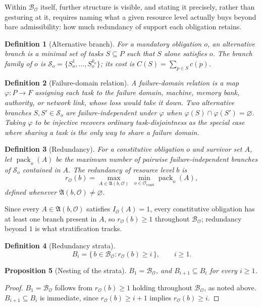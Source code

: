 \documentclass[11pt]{report}
\newtheorem{definition}{Definition}[chapter]
\newtheorem{proposition}[definition]{Proposition}
\begin{document}
Within $\mathcal B_{\mathcal O}$ itself, further structure is visible, and stating it precisely, rather than gesturing at it, requires naming what a given resource level actually buys beyond bare admissibility: how much redundancy of support each obligation retains.

\begin{definition}[Alternative branch]
For a mandatory obligation $o$, an alternative branch is a minimal set of tasks $S \subseteq P$ such that $S$ alone satisfies $o$. The branch family of $o$ is $\mathcal S_o = \{S_o^1, \ldots, S_o^{k_o}\}$; its cost is $C(S) = \sum_{p \in S} c(p)$.
\end{definition}

\begin{definition}[Failure-domain relation]
A failure-domain relation is a map $\varphi : P \to F$ assigning each task to the failure domain, machine, memory bank, authority, or network link, whose loss would take it down. Two alternative branches $S, S' \in \mathcal S_o$ are failure-independent under $\varphi$ when $\varphi(S) \cap \varphi(S') = \varnothing$. Taking $\varphi$ to be injective recovers ordinary task-disjointness as the special case where sharing a task is the only way to share a failure domain.
\end{definition}

\begin{definition}[Redundancy]
For a constitutive obligation $o$ and survivor set $A$, let $\operatorname{pack}_o(A)$ be the maximum number of pairwise failure-independent branches of $\mathcal S_o$ contained in $A$. The redundancy of resource level $b$ is
\[
r_{\mathcal O}(b) = \max_{A \in \mathfrak A(b, \mathcal O)} \ \min_{o \in \mathcal O_{\mathrm{const}}} \operatorname{pack}_o(A),
\]
defined whenever $\mathfrak A(b, \mathcal O) \ne \varnothing$.
\end{definition}

Since every $A \in \mathfrak A(b, \mathcal O)$ satisfies $I_{\mathcal O}(A) = 1$, every constitutive obligation has at least one branch present in $A$, so $r_{\mathcal O}(b) \ge 1$ throughout $\mathcal B_{\mathcal O}$; redundancy beyond $1$ is what stratification tracks.

\begin{definition}[Redundancy strata]
\[
B_i = \{\, b \in \mathcal B_{\mathcal O} : r_{\mathcal O}(b) \ge i \,\}, \qquad i \ge 1.
\]
\end{definition}

\begin{proposition}[Nesting of the strata]
$B_1 = \mathcal B_{\mathcal O}$, and $B_{i+1} \subseteq B_i$ for every $i \ge 1$.
\end{proposition}
\begin{proof}
$B_1 = \mathcal B_{\mathcal O}$ follows from $r_{\mathcal O}(b) \ge 1$ holding throughout $\mathcal B_{\mathcal O}$, as noted above. $B_{i+1} \subseteq B_i$ is immediate, since $r_{\mathcal O}(b) \ge i+1$ implies $r_{\mathcal O}(b) \ge i$.
\end{proof}
\end{document}
